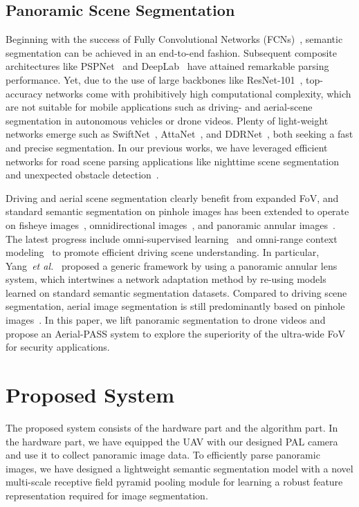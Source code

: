 \documentclass[letterpaper, 10 pt, conference]{ieeeconf}
\begin{document}
\subsection{Panoramic Scene Segmentation}

Beginning with the success of Fully Convolutional Networks (FCNs)~\cite{fcn}, semantic segmentation can be achieved in an end-to-end fashion. Subsequent composite architectures like PSPNet~\cite{pspnet} and DeepLab~\cite{deeplab} have attained remarkable parsing performance.
Yet, due to the use of large backbones like ResNet-101~\cite{resnet}, top-accuracy networks come with prohibitively high computational complexity, which are not suitable for mobile applications such as driving- and aerial-scene segmentation in autonomous vehicles or drone videos. 
Plenty of light-weight networks emerge such as SwiftNet~\cite{swiftnet}, AttaNet~\cite{attanet}, and DDRNet~\cite{ddrnet}, both seeking a fast and precise segmentation.
In our previous works, we have leveraged efficient networks for road scene parsing applications like nighttime scene segmentation~\cite{see_clearer_at_night} and unexpected obstacle detection~\cite{rfnet}.

Driving and aerial scene segmentation clearly benefit from expanded FoV, and standard semantic segmentation on pinhole images has been extended to operate on fisheye images~\cite{universal}, omnidirectional images~\cite{omniscape}, and panoramic annular images~\cite{pass}.
The latest progress include omni-supervised learning~\cite{ooss} and omni-range context modeling~\cite{omnirange} to promote efficient  driving scene understanding.
In particular, Yang~\textit{et al.}~\cite{pass} proposed a generic framework by using a panoramic annular lens system, which intertwines a network adaptation method by re-using models learned on standard semantic segmentation datasets.
Compared to driving scene segmentation, aerial image segmentation is still predominantly based on pinhole images~\cite{agriculture_vision,relation_augmented,aerial_lanenet,pointflow}.
In this paper, we lift  panoramic segmentation to drone videos and propose an Aerial-PASS system to explore the superiority of the ultra-wide FoV for security applications.



\section{Proposed System}

The proposed system consists of the hardware part and the algorithm part.
In the hardware part, we have equipped the UAV with our designed PAL camera and use it to collect panoramic image data.
To efficiently parse panoramic images, we have designed a lightweight semantic segmentation model with a novel multi-scale receptive field pyramid pooling module for learning a robust feature representation required for  image segmentation.
\end{document}
